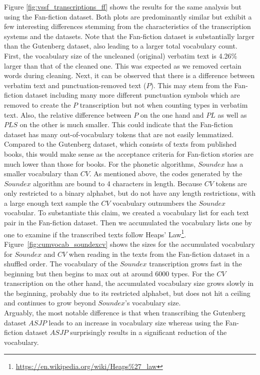 Figure \ref{fig:vssf_transcriptions_ff} shows the results for the same analysis but using the Fan-fiction dataset.
Both plots are predominantly similar but exhibit a few interesting differences stemming from the characteristics of the transcription systems and the datasets.
Note that the Fan-fiction dataset is substantially larger than the Gutenberg dataset, also leading to a larger total vocabulary count.\\
First, the vocabulary size of the uncleaned (original) verbatim text is 4.26\% larger than that of the cleaned one.
This was expected as we removed certain words during cleaning.
Next, it can be observed that there is a difference between verbatim text and punctuation-removed text ($P$).
This may stem from the Fan-fiction dataset including many more different punctuation symbols which are removed to create the $P$ transcription but not when counting types in verbatim text.
Also, the relative difference between $P$ on the one hand and $PL$ as well as $PLS$ on the other is much smaller.
This could indicate that the Fan-fiction dataset has many out-of-vocabulary tokens that are not easily lemmatized.
Compared to the Gutenberg dataset, which consists of texts from published books, this would make sense as the acceptance criteria for Fan-fiction stories are much lower than those for books.
For the phonetic algorithms, $Soundex$ has a smaller vocabulary than $CV$.
As mentioned above, the codes generated by the $Soundex$ algorithm are bound to 4 characters in length.
Because $CV$ tokens are only restricted to a binary alphabet, but do not have any length restrictions, with a large enough text sample the $CV$ vocabulary outnumbers the $Soundex$ vocabular.
To substantiate this claim, we created a vocabulary list for each text pair in the Fan-fiction dataset.
Then we accumulated the vocabulary lists one by one to examine if the transcribed texts follow Heaps' Law\footnote{\url{https://en.wikipedia.org/wiki/Heaps%27_law}}.
Figure~\ref{fig:cumvocab_soundexcv} shows the sizes for the accumulated vocabulary for $Soundex$ and $CV$ when reading in the texts from the Fan-fiction dataset in a shuffled order.
The vocabulary of the $Soundex$ transcription grows fast in the beginning but then begins to max out at around 6000 types.
For the $CV$ transcription on the other hand, the accumulated vocabulary size grows slowly in the beginning, probably due to its restricted alphabet, but does not hit a ceiling and continues to grow beyond $Soundex$'s vocabulary size.\\
Arguably, the most notable difference is that when transcribing the Gutenberg dataset $ASJP$ leads to an increase in vocabulary size whereas using the Fan-fiction dataset $ASJP$ surprisingly results in a significant reduction of the vocabulary.
